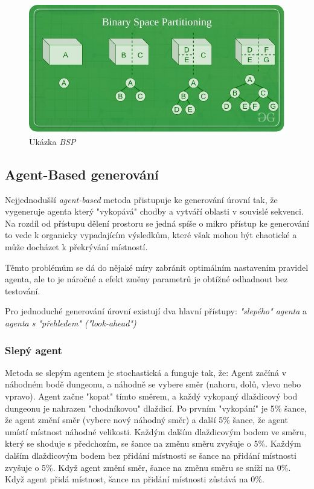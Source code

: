 \begin{figure}
  \centering      %
  \includegraphics[scale=0.6]{obr/BSP.jpg} %
  \caption{Ukázka \textit{BSP} \cite{BSPclanek}} %
  \label{BSP_ukazka} %
\end{figure}

\subsection{Agent-Based generování}

Nejjednodušší \textit{agent-based} metoda přistupuje ke generování úrovní tak, že vygeneruje agenta který "vykopává" chodby a vytváří oblasti v souvislé sekvenci. Na rozdíl od přístupu dělení prostoru se jedná spíše o mikro přístup ke generování to vede k organicky vypadajícím výsledkům, které však mohou být chaotické a může docházet k překrývání místností. 

Těmto problémům se dá do nějaké míry zabránit optimálním nastavením pravidel agenta, ale to je náročné a efekt změny parametrů je obtížné odhadnout bez testování.

Pro jednoduché generování úrovní existují dva hlavní přístupy: \textit{"slepého" agenta} a \textit{agenta s "přehledem" ("look-ahead")}

\subsubsection{Slepý agent}
Metoda se slepým agentem je stochastická a funguje tak, že: Agent začíná v náhodném bodě dungeonu, a náhodně se vybere směr (nahoru, dolů, vlevo nebo vpravo). Agent začne "kopat" tímto směrem, a každý vykopaný dlaždicový bod dungeonu je nahrazen "chodníkovou" dlaždicí. Po prvním "vykopání" je 5\% šance, že agent změní směr (vybere nový náhodný směr) a další 5\% šance, že agent umístí místnost náhodné velikosti. Každým dalším dlaždicovým bodem ve směru, který se shoduje s předchozím, se šance na změnu směru zvyšuje o 5\%. Každým dalším dlaždicovým bodem bez přidání místnosti se šance na přidání místnosti zvyšuje o 5\%. Když agent změní směr, šance na změnu směru se sníží na 0\%. Když agent přidá místnost, šance na přidání místnosti zůstává na 0\%.

